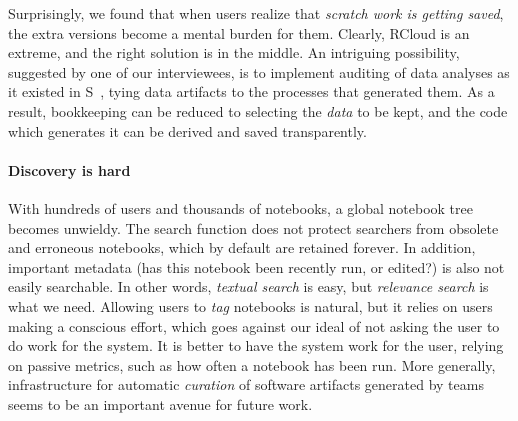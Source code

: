 Surprisingly, we found that when users realize that \emph{scratch work
is getting saved}, the extra versions become a mental burden for
them. Clearly, RCloud is an extreme, and the right solution is
in the middle. An intriguing possibility,
suggested by one of our interviewees, is to implement auditing of data
analyses as it existed in S~\cite{Becker:1988:Auditing}, tying
data artifacts to the processes that generated them. As a result,
bookkeeping can be reduced to selecting the \emph{data} to be kept,
and the code which generates it can be derived and saved transparently.




\paragraph*{Discovery is hard} 
With hundreds of users and thousands of notebooks, a global notebook tree
becomes unwieldy. The search function does not protect searchers from
obsolete and erroneous notebooks, which by default are retained
forever. In addition, important metadata (has this notebook been
recently run, or edited?) is also not easily searchable. In other words,
\emph{textual search} is easy, but \emph{relevance search} is what we
need. Allowing users to \emph{tag} notebooks is natural, but it
relies on users making a conscious effort, which goes against
our ideal of not asking the user to do work for the system.
It is better to have the system work for the user,
relying on passive metrics, such as how often a notebook has been run.
More generally, infrastructure for automatic \emph{curation} of
software artifacts generated by teams seems to be an important avenue
for future work.


